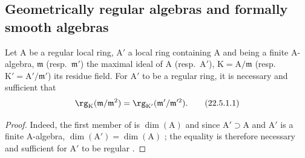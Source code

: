 \subsection{Geometrically regular algebras and formally smooth algebras}
\label{subsection:0.22.5}

\begin{proposition}[22.5.1]
\label{0.22.5.1}
Let $\mathrm{A}$ be a regular local ring, $\mathrm{A}'$ a local ring containing $\mathrm{A}$ and being a finite $\mathrm{A}$-algebra, $\mathfrak{m}$ (resp.~$\mathfrak{m}'$) the maximal ideal of $\mathrm{A}$ (resp.~$\mathrm{A}'$), $\mathrm{K}=\mathrm{A}/\mathfrak{m}$ (resp.~$\mathrm{K}'=\mathrm{A}'/\mathfrak{m}'$) its residue field.
For $\mathrm{A}'$ to be a regular ring, it is necessary and sufficient that
\[
\label{0.22.5.1.1}
  \rg_\mathrm{K}(\mathfrak{m}/\mathfrak{m}^2)=\rg_{\mathrm{K}'}(\mathfrak{m}'/\mathfrak{m}'^2).
  \tag{22.5.1.1}
\]
\end{proposition}

\begin{proof}
Indeed, the first member of  is $\dim(\mathrm{A})$  and since $\mathrm{A}'\supset\mathrm{A}$ and $\mathrm{A}'$ is a finite $\mathrm{A}$-algebra, $\dim(\mathrm{A}')=\dim(\mathrm{A})$ ; the equality  is therefore necessary and sufficient for $\mathrm{A}'$ to be regular .
\end{proof}

